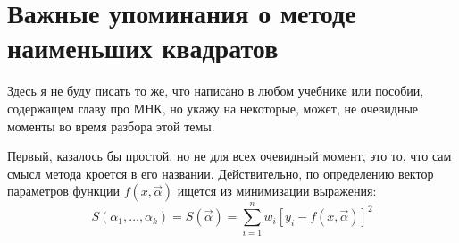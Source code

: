 \section{Важные упоминания о методе наименьших квадратов}
Здесь я не буду писать то же, что написано в любом учебнике или пособии, содержащем главу про МНК, но укажу на некоторые, может, не очевидные моменты во время разбора этой темы.

Первый, казалось бы простой, но не для всех очевидный момент, это то, что сам смысл метода кроется в его названии. Действительно, по определению вектор параметров функции $f(x, \vec \alpha)$ ищется из минимизации выражения:
\begin{equation}
    S(\alpha_1, \ldots, \alpha_k) = S(\vec \alpha) = \sum \limits_{i = 1}^{n}w_i\left[y_i - f(x, \vec \alpha)\right]^2
\end{equation}